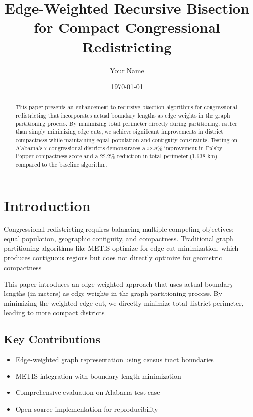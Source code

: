 \documentclass[11pt]{article}
\title{Edge-Weighted Recursive Bisection for Compact Congressional Redistricting}
\author{Your Name}
\date{\today}
\begin{document}
\maketitle

\begin{abstract}
This paper presents an enhancement to recursive bisection algorithms for congressional redistricting that incorporates actual boundary lengths as edge weights in the graph partitioning process. By minimizing total perimeter directly during partitioning, rather than simply minimizing edge cuts, we achieve significant improvements in district compactness while maintaining equal population and contiguity constraints. Testing on Alabama's 7 congressional districts demonstrates a 52.8\% improvement in Polsby-Popper compactness score and a 22.2\% reduction in total perimeter (1,638 km) compared to the baseline algorithm.
\end{abstract}

\section{Introduction}

Congressional redistricting requires balancing multiple competing objectives: equal population, geographic contiguity, and compactness. Traditional graph partitioning algorithms like METIS optimize for edge cut minimization, which produces contiguous regions but does not directly optimize for geometric compactness.

This paper introduces an edge-weighted approach that uses actual boundary lengths (in meters) as edge weights in the graph partitioning process. By minimizing the weighted edge cut, we directly minimize total district perimeter, leading to more compact districts.

\subsection{Key Contributions}

\begin{itemize}
\item Edge-weighted graph representation using census tract boundaries
\item METIS integration with boundary length minimization
\item Comprehensive evaluation on Alabama test case
\item Open-source implementation for reproducibility
\end{itemize}
\end{document}
